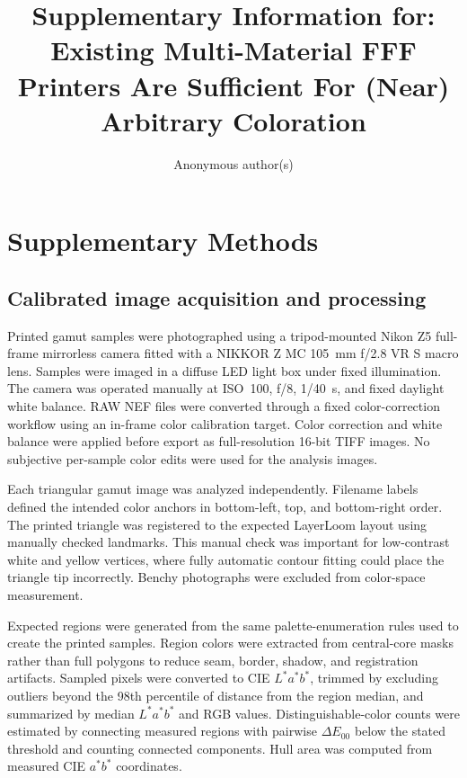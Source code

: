 \documentclass[preprint,12pt,authoryear]{elsarticle}
\begin{document}
\begin{frontmatter}

\title{Supplementary Information for: Existing Multi-Material FFF Printers Are Sufficient For (Near) Arbitrary Coloration}

\author{Anonymous author(s)}

\end{frontmatter}

\section*{Supplementary Methods}

\subsection*{Calibrated image acquisition and processing}

Printed gamut samples were photographed using a tripod-mounted Nikon Z5 full-frame mirrorless camera fitted with a NIKKOR Z MC 105~mm f/2.8 VR S macro lens. Samples were imaged in a diffuse LED light box under fixed illumination. The camera was operated manually at ISO~100, f/8, 1/40~s, and fixed daylight white balance. RAW NEF files were converted through a fixed color-correction workflow using an in-frame color calibration target. Color correction and white balance were applied before export as full-resolution 16-bit TIFF images. No subjective per-sample color edits were used for the analysis images.

Each triangular gamut image was analyzed independently. Filename labels defined the intended color anchors in bottom-left, top, and bottom-right order. The printed triangle was registered to the expected LayerLoom layout using manually checked landmarks. This manual check was important for low-contrast white and yellow vertices, where fully automatic contour fitting could place the triangle tip incorrectly. Benchy photographs were excluded from color-space measurement.

Expected regions were generated from the same palette-enumeration rules used to create the printed samples. Region colors were extracted from central-core masks rather than full polygons to reduce seam, border, shadow, and registration artifacts. Sampled pixels were converted to CIE \(L^*a^*b^*\), trimmed by excluding outliers beyond the 98th percentile of distance from the region median, and summarized by median \(L^*a^*b^*\) and RGB values. Distinguishable-color counts were estimated by connecting measured regions with pairwise \(\Delta E_{00}\) below the stated threshold and counting connected components. Hull area was computed from measured CIE \(a^*b^*\) coordinates.
\end{document}
